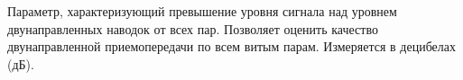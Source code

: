 Параметр, характеризующий превышение уровня сигнала над 
уровнем двунаправленных наводок от всех пар. Позволяет оценить 
качество двунаправленной приемопередачи по всем витым 
парам. Измеряется в децибелах (дБ).